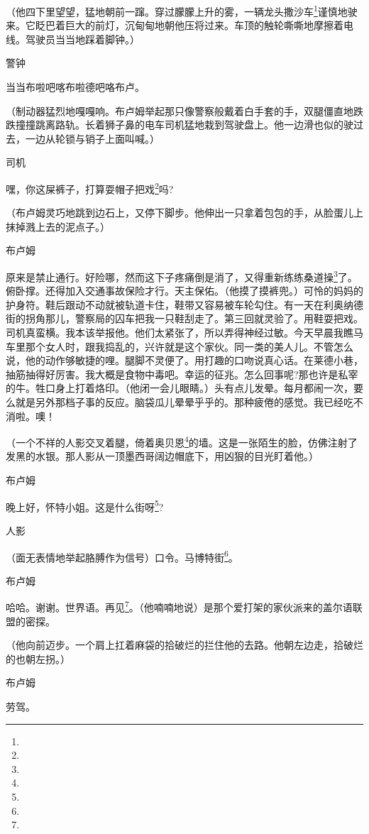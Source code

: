 \par （他四下里望望，猛地朝前一蹿。穿过朦朦上升的雾，一辆龙头撒沙车\footnote{}谨慎地驶来。它眨巴着巨大的前灯，沉甸甸地朝他压将过来。车顶的触轮嘶嘶地摩擦着电线。驾驶员当当地踩着脚钟。）
\par 警钟
\par 当当布啦吧喀布啦德吧咯布卢。
\par （制动器猛烈地嘎嘎响。布卢姆举起那只像警察般戴着白手套的手，双腿僵直地跌跌撞撞跳离路轨。长着狮子鼻的电车司机猛地栽到驾驶盘上。他一边滑也似的驶过去，一边从轮锁与销子上面叫喊。）
\par 司机
\par 嘿，你这屎裤子，打算耍帽子把戏\footnote{}吗?
\par （布卢姆灵巧地跳到边石上，又停下脚步。他伸出一只拿着包包的手，从脸蛋儿上抹掉溅上去的泥点子。）
\par 布卢姆
\par 原来是禁止通行。好险哪，然而这下子疼痛倒是消了，又得重新练练桑道操\footnote{}了。俯卧撑。还得加入交通事故保险才行。天主保佑。（他摸了摸裤兜。）可怜的妈妈的护身符。鞋后跟动不动就被轨道卡住，鞋带又容易被车轮勾住。有一天在利奥纳德街的拐角那儿，警察局的囚车把我一只鞋刮走了。第三回就灵验了。用鞋耍把戏。司机真蛮横。我本该举报他。他们太紧张了，所以弄得神经过敏。今天早晨我瞧马车里那个女人时，跟我捣乱的，兴许就是这个家伙。同一类的美人儿。不管怎么说，他的动作够敏捷的哩。腿脚不灵便了。用打趣的口吻说真心话。在莱德小巷，抽筋抽得好厉害。我大概是食物中毒吧。幸运的征兆。怎么回事呢?那也许是私宰的牛。牲口身上打着烙印。（他闭一会儿眼睛。）头有点儿发晕。每月都闹一次，要么就是另外那档子事的反应。脑袋瓜儿晕晕乎乎的。那种疲倦的感觉。我已经吃不消啦。噢！
\par （一个不祥的人影交叉着腿，倚着奥贝恩\footnote{}的墙。这是一张陌生的脸，仿佛注射了发黑的水银。那人影从一顶墨西哥阔边帽底下，用凶狠的目光盯着他。）
\par 布卢姆
\par 晚上好，怀特小姐。这是什么街呀\footnote{}?
\par 人影
\par （面无表情地举起胳膊作为信号）口令。马博特街\footnote{}。
\par 布卢姆
\par 哈哈。谢谢。世界语。再见\footnote{}。（他喃喃地说）是那个爱打架的家伙派来的盖尔语联盟的密探。
\par （他向前迈步。一个肩上扛着麻袋的拾破烂的拦住他的去路。他朝左边走，拾破烂的也朝左拐。）
\par 布卢姆
\par 劳驾。
